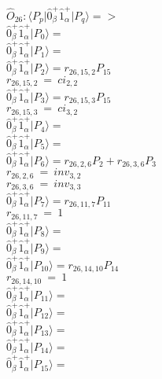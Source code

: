 \documentclass[14pt]{article}
\begin{document}
    $\hat{O}_{26}:  \langle{P_p}\vert \hat{0}_{\beta}^{+}\hat{1}_{\alpha}^{+} \vert{P_q}\rangle => $ \\ 
    $ \hat{0}_{\beta}^{+}\hat{1}_{\alpha}^{+} \vert{P_{0}}\rangle =  $ \\ 
    $ \hat{0}_{\beta}^{+}\hat{1}_{\alpha}^{+} \vert{P_{1}}\rangle =  $ \\ 
    $ \hat{0}_{\beta}^{+}\hat{1}_{\alpha}^{+} \vert{P_{2}}\rangle = {r}_{26,15,2}P_{15} $ \\ 
    ${r}_{26,15,2}\ =\ {ci}_{2,2} $ \\ 
    $ \hat{0}_{\beta}^{+}\hat{1}_{\alpha}^{+} \vert{P_{3}}\rangle = {r}_{26,15,3}P_{15} $ \\ 
    ${r}_{26,15,3}\ =\ {ci}_{3,2} $ \\ 
    $ \hat{0}_{\beta}^{+}\hat{1}_{\alpha}^{+} \vert{P_{4}}\rangle =  $ \\ 
    $ \hat{0}_{\beta}^{+}\hat{1}_{\alpha}^{+} \vert{P_{5}}\rangle =  $ \\ 
    $ \hat{0}_{\beta}^{+}\hat{1}_{\alpha}^{+} \vert{P_{6}}\rangle = {r}_{26,2,6}P_{2}+{r}_{26,3,6}P_{3} $ \\ 
    ${r}_{26,2,6}\ =\ {inv}_{3,2} $ \\ 
    ${r}_{26,3,6}\ =\ {inv}_{3,3} $ \\ 
    $ \hat{0}_{\beta}^{+}\hat{1}_{\alpha}^{+} \vert{P_{7}}\rangle = {r}_{26,11,7}P_{11} $ \\ 
    ${r}_{26,11,7}\ =\ 1 $ \\ 
    $ \hat{0}_{\beta}^{+}\hat{1}_{\alpha}^{+} \vert{P_{8}}\rangle =  $ \\ 
    $ \hat{0}_{\beta}^{+}\hat{1}_{\alpha}^{+} \vert{P_{9}}\rangle =  $ \\ 
    $ \hat{0}_{\beta}^{+}\hat{1}_{\alpha}^{+} \vert{P_{10}}\rangle = {r}_{26,14,10}P_{14} $ \\ 
    ${r}_{26,14,10}\ =\ 1 $ \\ 
    $ \hat{0}_{\beta}^{+}\hat{1}_{\alpha}^{+} \vert{P_{11}}\rangle =  $ \\ 
    $ \hat{0}_{\beta}^{+}\hat{1}_{\alpha}^{+} \vert{P_{12}}\rangle =  $ \\ 
    $ \hat{0}_{\beta}^{+}\hat{1}_{\alpha}^{+} \vert{P_{13}}\rangle =  $ \\ 
    $ \hat{0}_{\beta}^{+}\hat{1}_{\alpha}^{+} \vert{P_{14}}\rangle =  $ \\ 
    $ \hat{0}_{\beta}^{+}\hat{1}_{\alpha}^{+} \vert{P_{15}}\rangle =  $ \\ 
    
\end{document}
